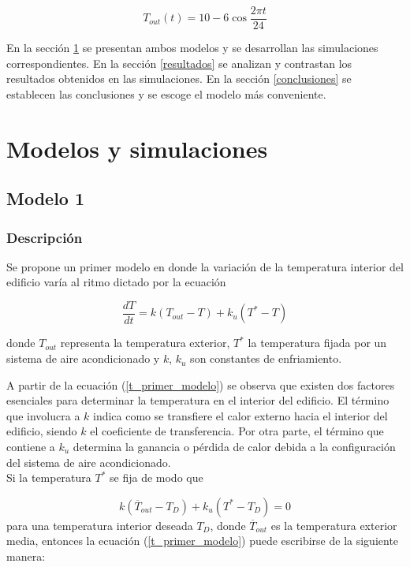 \documentclass{sig-alternate}
\begin{document}
\begin{equation}
\label{t_exterior}
T_{out} (t) = 10 - 6 \cos\frac{2 \pi t}{24}
\end{equation}

En la secci\'{o}n \ref{modelosysimulaciones} se presentan ambos modelos y
se desarrollan las simulaciones correspondientes.
En la secci\'{o}n \ref{resultados} se analizan y contrastan los resultados
obtenidos en las simulaciones.
En la secci\'{o}n \ref{conclusiones} se establecen las conclusiones y se
escoge el modelo m\'{a}s conveniente.

\section{Modelos y simulaciones}\label{modelosysimulaciones}

\subsection{Modelo 1}

\subsubsection{Descripci\'{o}n}

Se propone un primer modelo en donde la variaci\'{o}n de la temperatura interior
del edificio var\'{i}a al ritmo dictado por la ecuaci\'{o}n

\begin{equation}
\label{t_primer_modelo}
\frac{dT}{dt} = k ( T_{out} - T ) + k_{u} ( T^{*} - T )
\end{equation}

donde $T_{out}$ representa la temperatura exterior, $T^{*}$ la temperatura
fijada por un sistema de aire acondicionado y $k$, $k_{u}$ son constantes
de enfriamiento.

A partir de la ecuaci\'{o}n (\ref{t_primer_modelo}) se observa que existen dos
factores esenciales para determinar la temperatura en el interior del edificio.
El t\'{e}rmino que involucra a $k$ indica como se
transfiere el calor externo hacia el interior del edificio, siendo $k$ el
coeficiente de transferencia. Por otra parte, el t\'{e}rmino que contiene a $k_{u}$
 determina la ganancia o p\'{e}rdida de calor debida a la configuraci\'{o}n del 
sistema de aire acondicionado. \\
Si la temperatura $T^{*}$ se fija de modo que 

\begin{equation}
\label{t_fijada}
k ( \overline{T}_{out} - T_{D})
+ k_{u} ( T^{*} - T_{D} ) = 0
\end{equation}
para una temperatura interior deseada $T_{D}$,
donde $\overline{T}_{out}$ es la temperatura exterior media, entonces la
ecuaci\'{o}n (\ref{t_primer_modelo}) puede escribirse de la siguiente manera:
\end{document}
